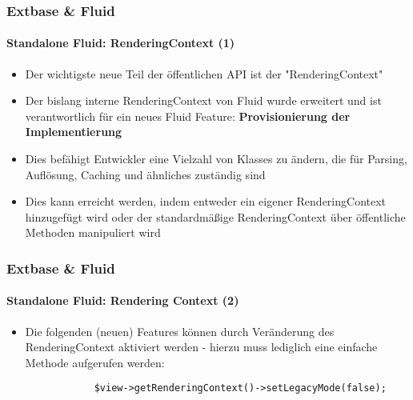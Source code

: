 
\begin{frame}[fragile]
	\frametitle{Extbase \& Fluid}
	\framesubtitle{Standalone Fluid: RenderingContext (1)}

	\lstset{basicstyle=\tiny\ttfamily}

	\begin{itemize}

		\item Der wichtigste neue Teil der öffentlichen API ist der "RenderingContext"

		\item Der bislang interne RenderingContext von Fluid wurde erweitert und ist verantwortlich für ein neues Fluid Feature: \textbf{Provisionierung der Implementierung}

		\item Dies befähigt Entwickler eine Vielzahl von Klasses zu ändern, die für Parsing, Auflösung, Caching und ähnliches zuständig sind

		\item Dies kann erreicht werden, indem entweder ein eigener RenderingContext hinzugefügt wird oder der standardmäßige RenderingContext über öffentliche Methoden manipuliert wird

	\end{itemize}

\end{frame}


\begin{frame}[fragile]
	\frametitle{Extbase \& Fluid}
	\framesubtitle{Standalone Fluid: Rendering Context (2)}

	\lstset{basicstyle=\smaller\ttfamily}

	\begin{itemize}

		\item Die folgenden (neuen) Features können durch Veränderung des RenderingContext aktiviert werden - hierzu muss lediglich eine einfache Methode aufgerufen werden:

		\begin{lstlisting}
			$view->getRenderingContext()->setLegacyMode(false);
		\end{lstlisting}

	\end{itemize}

\end{frame}

